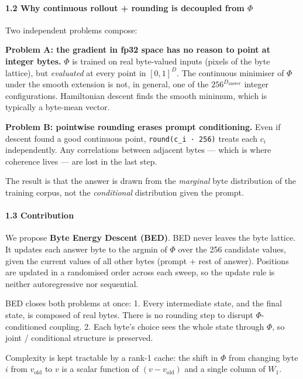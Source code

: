 \documentclass[
  11pt,
  a4paper,
]{article}
\begin{document}
\paragraph{\texorpdfstring{1.2 Why continuous rollout + rounding is
decoupled from
\(\Phi\)}{1.2 Why continuous rollout + rounding is decoupled from \textbackslash Phi}}\label{why-continuous-rollout-rounding-is-decoupled-from-phi}

Two independent problems compose:

\textbf{Problem A: the gradient in fp32 space has no reason to point at
integer bytes.} \(\Phi\) is trained on real byte-valued inputs (pixels
of the byte lattice), but \emph{evaluated} at every point in
\([0,1]^D\). The continuous minimiser of \(\Phi\) under the smooth
extension is not, in general, one of the \(256^{D_{\text{answer}}}\)
integer configurations. Hamiltonian descent finds the smooth minimum,
which is typically a byte-mean vector.

\textbf{Problem B: pointwise rounding erases prompt conditioning.} Even
if descent found a good continuous point, \texttt{round(c\_i\ ·\ 256)}
treats each \(c_i\) independently. Any correlations between adjacent
bytes --- which is where coherence lives --- are lost in the last step.

The result is that the answer is drawn from the \emph{marginal} byte
distribution of the training corpus, not the \emph{conditional}
distribution given the prompt.

\paragraph{1.3 Contribution}\label{contribution}

We propose \textbf{Byte Energy Descent (BED)}. BED never leaves the byte
lattice. It updates each answer byte to the argmin of \(\Phi\) over the
256 candidate values, given the current values of all other bytes
(prompt + rest of answer). Positions are updated in a randomised order
across each sweep, so the update rule is neither autoregressive nor
sequential.

BED closes both problems at once: 1. Every intermediate state, and the
final state, is composed of real bytes. There is no rounding step to
disrupt \(\Phi\)-conditioned coupling. 2. Each byte's choice sees the
whole state through \(\Phi\), so joint / conditional structure is
preserved.

Complexity is kept tractable by a rank-1 cache: the shift in \(\Phi\)
from changing byte \(i\) from \(v_{\text{old}}\) to \(v\) is a scalar
function of \((v - v_{\text{old}})\) and a single column of \(W_1\).
\end{document}
